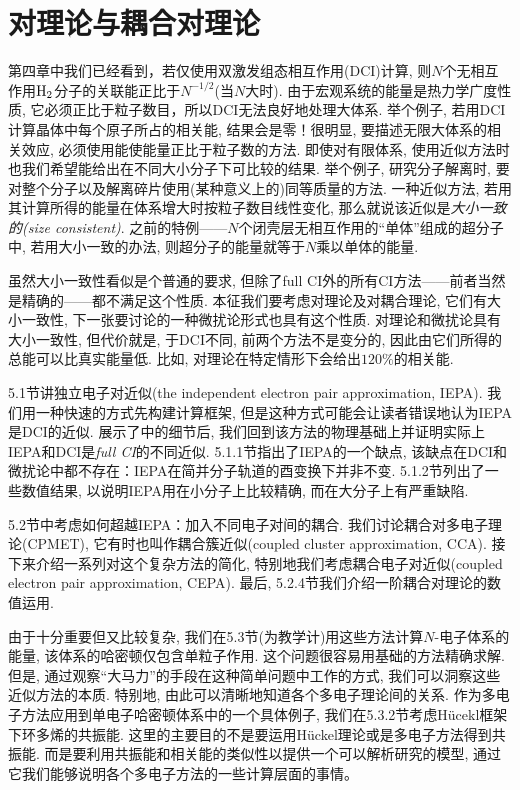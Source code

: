 \chapter{对理论与耦合对理论}
第四章中我们已经看到，若仅使用双激发组态相互作用(DCI)计算, 则$N$个无相互作用$\mathrm{H}_2$分子的关联能正比于$N^{-1/2}$(当$N$大时). 由于宏观系统的能量是热力学广度性质, 它必须正比于粒子数目，所以DCI无法良好地处理大体系. 举个例子, 若用DCI计算晶体中每个原子所占的相关能, 结果会是零！很明显, 要描述无限大体系的相关效应, 必须使用能使能量正比于粒子数的方法. 即使对有限体系, 使用近似方法时也我们希望能给出在不同大小分子下可比较的结果. 举个例子, 研究分子解离时, 要对整个分子以及解离碎片使用(某种意义上的)同等质量的方法. 一种近似方法, 若用其计算所得的能量在体系增大时按粒子数目线性变化, 那么就说该近似是\emph{大小一致的(size consistent)}. 之前的特例——$N$个闭壳层无相互作用的``单体''组成的超分子中, 若用大小一致的办法, 则超分子的能量就等于$N$乘以单体的能量.

虽然大小一致性看似是个普通的要求, 但除了full CI外的所有CI方法——前者当然是精确的——都不满足这个性质. 本征我们要考虑对理论及对耦合理论, 它们有大小一致性, 下一张要讨论的一种微扰论形式也具有这个性质. 对理论和微扰论具有大小一致性, 但代价就是, 于DCI不同, 前两个方法不是变分的, 因此由它们所得的总能可以比真实能量低. 比如, 对理论在特定情形下会给出$120\%$的相关能.

5.1节讲独立电子对近似(the independent electron pair approximation, IEPA). 我们用一种快速的方式先构建计算框架, 但是这种方式可能会让读者错误地认为IEPA是DCI的近似. 展示了中的细节后, 我们回到该方法的物理基础上并证明实际上IEPA和DCI是\emph{full CI}的不同近似. 5.1.1节指出了IEPA的一个缺点, 该缺点在DCI和微扰论中都不存在：IEPA在简并分子轨道的酉变换下并非不变. 5.1.2节列出了一些数值结果, 以说明IEPA用在小分子上比较精确, 而在大分子上有严重缺陷.

5.2节中考虑如何超越IEPA：加入不同电子对间的耦合. 我们讨论耦合对多电子理论(CPMET), 它有时也叫作耦合簇近似(coupled cluster approximation, CCA). 接下来介绍一系列对这个复杂方法的简化, 特别地我们考虑耦合电子对近似(coupled electron pair approximation, CEPA). 最后, 5.2.4节我们介绍一阶耦合对理论的数值运用.

由于十分重要但又比较复杂, 我们在5.3节(为教学计)用这些方法计算$N$-电子体系的能量, 该体系的哈密顿仅包含单粒子作用. 这个问题很容易用基础的方法精确求解. 但是, 通过观察``大马力''的手段在这种简单问题中工作的方式, 我们可以洞察这些近似方法的本质. 特别地, 由此可以清晰地知道各个多电子理论间的关系. 作为多电子方法应用到单电子哈密顿体系中的一个具体例子, 我们在5.3.2节考虑H\"ucekl框架下环多烯的共振能. 这里的主要目的不是要运用H\"uckel理论或是多电子方法得到共振能. 而是要利用共振能和相关能的类似性以提供一个可以解析研究的模型, 通过它我们能够说明各个多电子方法的一些计算层面的事情。
